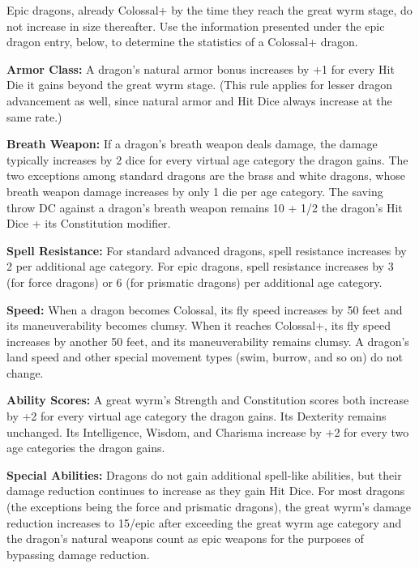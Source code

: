 \documentclass{article}
\begin{document}
Epic dragons, already Colossal+ by the time they reach the great wyrm stage, do 
not increase in size thereafter. Use the information presented under the epic dragon 
entry, below, to determine the statistics of a Colossal+ dragon. 

\vspace{12pt}
\textbf{Armor Class:} A dragon's natural armor bonus increases by +1 for every 
Hit Die it gains beyond the great wyrm stage. (This rule applies for lesser dragon 
advancement as well, since natural armor and Hit Dice always increase at the same 
rate.) 

\vspace{12pt}
\textbf{Breath Weapon:} If a dragon's breath weapon deals damage, the damage typically 
increases by 2 dice for every virtual age category the dragon gains. The two exceptions 
among standard dragons\textit{ }are the brass and white dragons, whose breath weapon 
damage increases by only 1 die per age category. The saving throw DC against a 
dragon's breath weapon remains 10 + 1/2 the dragon's Hit Dice + its Constitution 
modifier. 

\vspace{12pt}
\textbf{Spell Resistance:} For standard advanced dragons, spell resistance increases 
by 2 per additional age category. For epic dragons, spell resistance increases 
by 3 (for force dragons) or 6 (for prismatic dragons) per additional age category. 

\vspace{12pt}
\textbf{Speed:} When a dragon becomes Colossal, its fly speed increases by 50 feet 
and its maneuverability becomes clumsy. When it reaches Colossal+, its fly speed 
increases by another 50 feet, and its maneuverability remains clumsy. A dragon's 
land speed and other special movement types (swim, burrow, and so on) do not change. 

\vspace{12pt}
\textbf{Ability Scores: }A great wyrm's Strength and Constitution scores both increase 
by +2 for every virtual age category the dragon gains. Its Dexterity remains unchanged. 
Its Intelligence, Wisdom, and Charisma increase by +2 for every two age categories 
the dragon gains. 

\vspace{12pt}
\textbf{Special Abilities:} Dragons do not gain additional spell-like abilities, 
but their damage reduction continues to increase as they gain Hit Dice. For most 
dragons (the exceptions being the force and prismatic dragons), the great wyrm's 
damage reduction increases to 15/epic after exceeding the great wyrm age category 
and the dragon's natural weapons count as epic weapons for the purposes of bypassing 
damage reduction.
\end{document}
